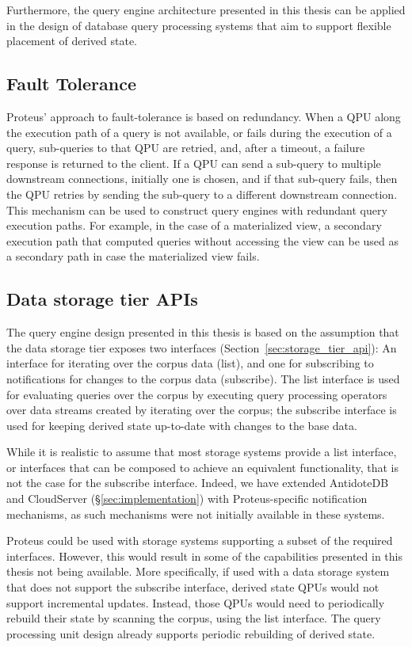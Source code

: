 Furthermore, the query engine architecture presented in this thesis can be applied in the design of database query processing
systems that aim to support flexible placement of derived state.

\subsection{Fault Tolerance}

Proteus' approach to fault-tolerance is based on redundancy.
When a QPU along the execution path of a query is not available, or fails during the execution of a query,
sub-queries to that QPU are retried, and, after a timeout, a failure response is returned to the client.
If a QPU can send a sub-query to multiple downstream connections, initially one is chosen,
and if that sub-query fails, then the QPU retries by sending the sub-query to a different downstream connection.
This mechanism can be used to construct query engines with redundant query execution paths.
For example, in the case of a materialized view, a secondary execution path that computed queries without accessing
the view can be used as a secondary path in case the materialized view fails.

\subsection{Data storage tier APIs}

The query engine design presented in this thesis is based on the assumption that the data storage tier exposes
two interfaces (Section~\ref{sec:storage_tier_api}):
An interface for iterating over the corpus data (list), and one for subscribing to notifications for changes to the
corpus data (subscribe).
The list interface is used for evaluating queries over the corpus by executing query processing operators over data streams
created by iterating over the corpus;
the subscribe interface is used for keeping derived state up-to-date with changes to the base data.

While it is realistic to assume that most storage systems provide a list interface,
or interfaces that can be composed to achieve an equivalent functionality,
that is not the case for the subscribe interface.
Indeed, we have extended AntidoteDB and CloudServer (\S\ref{sec:implementation}) with Proteus-specific
notification mechanisms,
as such mechanisms were not initially available in these systems.

Proteus could be used with storage systems supporting a subset of the required interfaces.
However, this would result in some of the capabilities presented in this thesis not being available.
More specifically, if used with a data storage system that does not support the subscribe interface,
derived state QPUs would not support incremental updates.
Instead, those QPUs would need to periodically rebuild their state by scanning the corpus, using the list interface.
The query processing unit design already supports periodic rebuilding of derived state.